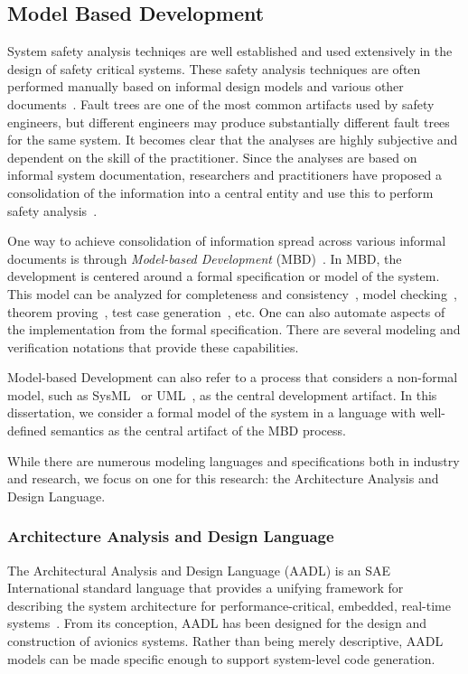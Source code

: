 \subsection{Model Based Development}
\label{sec:mbd}
System safety analysis techniqes are well established and used extensively in the design of safety critical systems. These safety analysis techniques are often performed manually based on informal design models and various other documents~\cite{schatz2002model,Joshi05:Dasc}. Fault trees are one of the most common artifacts used by safety engineers, but different engineers may produce substantially different fault trees for the same system. It becomes clear that the analyses are highly subjective and dependent on the skill of the practitioner. Since the analyses are based on informal system documentation, researchers and practitioners have proposed a consolidation of the information into a central entity and use this to perform safety analysis~\cite{joshi2008behavioral, Joshi05:SafeComp, Joshi07:Hase, CAV2015:BoCiGrMa, Bozzano:2010:DSA:1951720, lisagor2011model}.

One way to achieve consolidation of information spread across various informal documents is through \emph{Model-based Development} (MBD)~\cite{schatz2002model}. In MBD, the development is centered around a formal specification or model of the system. This model can be analyzed for completeness and consistency~\cite{heimdahl1996completeness}, model checking~\cite{miller2010software,clarke2018model, grumberg1994model}, theorem proving~\cite{rayadurgam2003using}, test case generation~\cite{anand2013orchestrated,rayadurgam2001coverage}, etc. One can also automate aspects of the implementation from the formal specification. There are several modeling and verification notations that provide these capabilities. 

Model-based Development can also refer to a process that considers a non-formal model, such as SysML~\cite{friedenthal2014practical} or UML~\cite{fowler2003brief}, as the central development artifact. In this dissertation, we consider a formal model of the system in a language with well-defined semantics as the central artifact of the MBD process. 

While there are numerous modeling languages and specifications both in industry and research, we focus on one for this research: the Architecture Analysis and Design Language. 

\subsubsection{Architecture Analysis and Design Language}
The Architectural Analysis and Design Language (AADL) is an SAE International standard language that provides a unifying framework for describing the system architecture for performance-critical, embedded, real-time systems~\cite{AADL_Standard,FeilerModelBasedEngineering2012}. From its conception, AADL has been designed for the design and construction of avionics systems.  Rather than being merely descriptive, AADL models can be made specific enough to support system-level code generation.  
 
